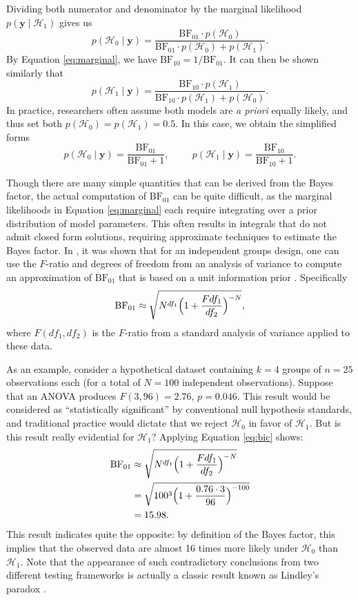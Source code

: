 \documentclass[12pt,twoside,a4paper]{article}
\begin{document}
Dividing both numerator and denominator by the marginal likelihood $p(\bm{y}\mid \mathcal{H}_1)$ gives us%
\[
  p(\mathcal{H}_0\mid \bm{y}) = \frac{\text{BF}_{01}\cdot p(\mathcal{H}_0)}{\text{BF}_{01}\cdot p(\mathcal{H}_0) + p(\mathcal{H}_1)}.
\]%
By Equation \ref{eq:marginal}, we have $\text{BF}_{10} = 1/\text{BF}_{01}$. It can then be shown similarly that
\[
  p(\mathcal{H}_1\mid \bm{y}) = \frac{\text{BF}_{10}\cdot p(\mathcal{H}_1)}{\text{BF}_{10}\cdot p(\mathcal{H}_1) + p(\mathcal{H}_0)}.
\]%
In practice, researchers often assume both models are {\it a priori} equally likely, and thus set both $p(\mathcal{H}_0)=p(\mathcal{H}_1) = 0.5$. In this case, we obtain the simplified forms%
\begin{equation}\label{eq:probability}
  p(\mathcal{H}_0\mid \bm{y}) = \frac{\text{BF}_{01}}{\text{BF}_{01}+1}, \hspace{1cm} p(\mathcal{H}_1\mid \bm{y}) = \frac{\text{BF}_{10}}{\text{BF}_{10}+1}.
\end{equation}


Though there are many simple quantities that can be derived from the Bayes factor, the actual computation of $\text{BF}_{01}$ can be quite difficult, as the marginal likelihoods in Equation \ref{eq:marginal} each require integrating over a prior distribution of model parameters. This often results in integrals that do not admit closed form solutions, requiring approximate techniques to estimate the Bayes factor. In \citet{faulkenberry2018}, it was shown that for an independent groups design, one can use the $F$-ratio and degrees of freedom from an analysis of variance to compute an approximation of $\text{BF}_{01}$ that is based on a unit information prior \citep{wagenmakers2007,masson2011}. Specifically%
\begin{equation}\label{eq:bic}
  \text{BF}_{01} \approx \sqrt{N^{df_1}\Bigl(1+\frac{Fdf_1}{df_2}\Bigr)^{-N}},
\end{equation}%
where $F(df_1,df_2)$ is the $F$-ratio from a standard analysis of variance applied to these data.

As an example, consider a hypothetical dataset containing $k=4$ groups of $n=25$ observations each (for a total of $N=100$ independent observations). Suppose that an ANOVA produces $F(3,96)=2.76$, $p=0.046$. This result would be considered as ``statistically significant'' by conventional null hypothesis standards, and traditional practice would dictate that we reject $\mathcal{H}_0$ in favor of $\mathcal{H}_1$. But is this result really evidential for $\mathcal{H}_1$? Applying Equation \ref{eq:bic} shows:%
\begin{align*}
  \text{BF}_{01} & \approx \sqrt{N^{df_1}\Bigl(1+\frac{Fdf_1}{df_2}\Bigr)^{-N}}\\
         & = \sqrt{100^3\Bigl(1+\frac{0.76\cdot 3}{96}\Bigr)^{-100}}\\
  &= 15.98.
\end{align*}%
This result indicates quite the opposite: by definition of the Bayes factor, this implies that the observed data are almost 16 times more likely under $\mathcal{H}_0$ than $\mathcal{H}_1$. Note that the appearance of such contradictory conclusions from two different testing frameworks is actually a classic result known as Lindley's paradox \citep{lindley1957}.
\end{document}
